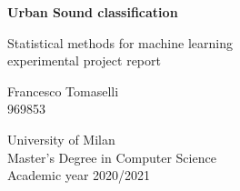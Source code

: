 \begin{titlepage}
    \begin{center}
        \Large
        \textbf{Urban Sound classification}

        \vspace{0.5cm}
        \large

        Statistical methods for machine learning\\ experimental 
        project report
        \vspace{1.5cm}
        
        Francesco Tomaselli\\
        \small
        969853
        \vspace{.5cm}

        \vfill     
        \normalsize             
        University of Milan\\
        Master's Degree in Computer Science\\
        Academic year 2020/2021
             
    \end{center}
 \end{titlepage}